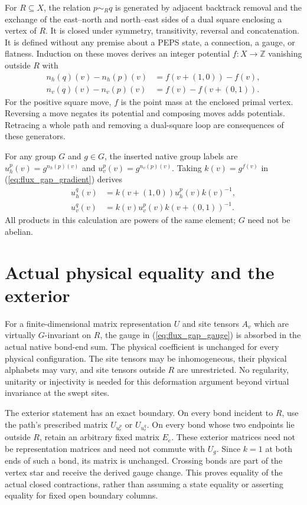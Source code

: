 \documentclass{article}
\begin{document}
For $R\subseteq X$, the relation $p\sim_R q$ is generated by adjacent
backtrack removal and the exchange of the east--north and north--east
sides of a dual square enclosing a vertex of $R$. It is closed under
symmetry, transitivity, reversal and concatenation. It is defined
without any premise about a PEPS state, a connection, a gauge, or flatness.
Induction on these moves derives an integer potential $f:X\to\mathbb Z$
vanishing outside $R$ with
\begin{align}
    n_h(q)(v)-n_h(p)(v) & =f(v+(1,0))-f(v), \\
    n_v(q)(v)-n_v(p)(v) & =f(v)-f(v+(0,1)).
    \label{eq:flux_gap_gradient}
\end{align}
For the positive square move, $f$ is the point mass at the enclosed
primal vertex. Reversing a move negates its potential and composing
moves adds potentials. Retracing a whole path and removing a dual-square
loop are consequences of these generators.

For any group $G$ and $g\in G$, the inserted native group labels are
$u_h^p(v)=g^{n_h(p)(v)}$ and $u_v^p(v)=g^{n_v(p)(v)}$.
Taking $k(v)=g^{f(v)}$ in (\ref{eq:flux_gap_gradient}) derives
\begin{align}
    u_h^q(v) & =k(v+(1,0))u_h^p(v)k(v)^{-1}, \\
    u_v^q(v) & =k(v)u_v^p(v)k(v+(0,1))^{-1}.
    \label{eq:flux_gap_gauge}
\end{align}
All products in this calculation are powers of the same element;
$G$ need not be abelian.

\section{Actual physical equality and the exterior}
For a finite-dimensional matrix representation $U$ and site tensors
$A_v$ which are virtually $G$-invariant on $R$, the gauge in
(\ref{eq:flux_gap_gauge}) is absorbed in the actual native bond-end sum.
The physical coefficient is unchanged for every physical configuration.
The site tensors may be inhomogeneous, their physical alphabets may vary,
and site tensors outside $R$ are unrestricted. No regularity, unitarity
or injectivity is needed for this deformation argument beyond virtual
invariance at the swept sites.

The exterior statement has an exact boundary. On every bond incident
to $R$, use the path's prescribed matrix $U_{u_e^p}$ or $U_{u_e^q}$.
On every bond whose two endpoints lie outside $R$, retain an arbitrary
fixed matrix $E_e$. These exterior matrices need not be representation
matrices and need not commute with $U_g$. Since $k=1$ at both ends of
such a bond, its matrix is unchanged. Crossing bonds are part of the
vertex star and receive the derived gauge change. This proves equality
of the actual closed contractions, rather than assuming a state equality
or asserting equality for fixed open boundary columns.
\end{document}
